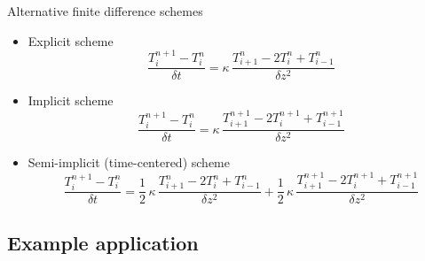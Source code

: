 \documentclass[aspectratio=1610]{beamer}
\begin{document}
    \begin{frame}{Alternative finite difference schemes}
      \begin{itemize}[<+->]
        \item Explicit scheme
        $$\frac{T_i^{n+1}-T_i^n}{\delta t}
         =\kappa\,\frac{T_{i+1}^n-2T_i^n+T_{i-1}^n}{\delta z^2}$$
        \item Implicit scheme
        $$\frac{T_i^{n+1}-T_i^n}{\delta t}
          =\kappa\,\frac{T_{i+1}^{n+1}-2T_i^{n+1}+T_{i-1}^{n+1}}{\delta z^2}$$
        \item Semi-implicit (time-centered) scheme
        $$\frac{T_i^{n+1}-T_i^n}{\delta t}
          =\frac{1}{2}\,\kappa\,\frac{T_{i+1}^n-2T_i^n+T_{i-1}^n}{\delta z^2}
          +\frac{1}{2}\,\kappa\,\frac{T_{i+1}^{n+1}-2T_i^{n+1}+T_{i-1}^{n+1}}{\delta z^2}$$
      \end{itemize}
    \end{frame}



\subsection{Example application}
\end{document}
